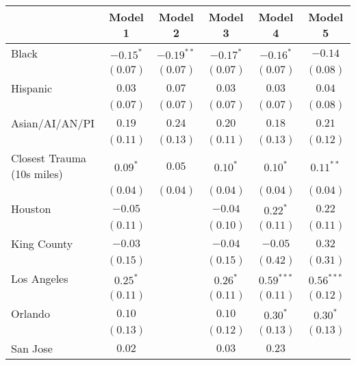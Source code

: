 
\begin{table}[ht!]
\begin{center}
\begin{tabular}{l c c c c c}
\toprule
 & Model 1 & Model 2 & Model 3 & Model 4 & Model 5 \\
\midrule
Black                      & $-0.15^{*}$ & $-0.19^{**}$ & $-0.17^{*}$ & $-0.16^{*}$  & $-0.14$      \\
                           & $(0.07)$    & $(0.07)$     & $(0.07)$    & $(0.07)$     & $(0.08)$     \\
Hispanic                   & $0.03$      & $0.07$       & $0.03$      & $0.03$       & $0.04$       \\
                           & $(0.07)$    & $(0.07)$     & $(0.07)$    & $(0.07)$     & $(0.08)$     \\
Asian/AI/AN/PI             & $0.19$      & $0.24$       & $0.20$      & $0.18$       & $0.21$       \\
                           & $(0.11)$    & $(0.13)$     & $(0.11)$    & $(0.13)$     & $(0.12)$     \\
Closest Trauma (10s miles) & $0.09^{*}$  & $0.05$       & $0.10^{*}$  & $0.10^{*}$   & $0.11^{**}$  \\
                           & $(0.04)$    & $(0.04)$     & $(0.04)$    & $(0.04)$     & $(0.04)$     \\
Houston                    & $-0.05$     &              & $-0.04$     & $0.22^{*}$   & $0.22$       \\
                           & $(0.11)$    &              & $(0.10)$    & $(0.11)$     & $(0.11)$     \\
King County                & $-0.03$     &              & $-0.04$     & $-0.05$      & $0.32$       \\
                           & $(0.15)$    &              & $(0.15)$    & $(0.42)$     & $(0.31)$     \\
Los Angeles                & $0.25^{*}$  &              & $0.26^{*}$  & $0.59^{***}$ & $0.56^{***}$ \\
                           & $(0.11)$    &              & $(0.11)$    & $(0.11)$     & $(0.12)$     \\
Orlando                    & $0.10$      &              & $0.10$      & $0.30^{*}$   & $0.30^{*}$   \\
                           & $(0.13)$    &              & $(0.12)$    & $(0.13)$     & $(0.13)$     \\
San Jose                   & $0.02$      &              & $0.03$      & $0.23$       &              \\

\end{tabular}
\end{center}
\end{table}
